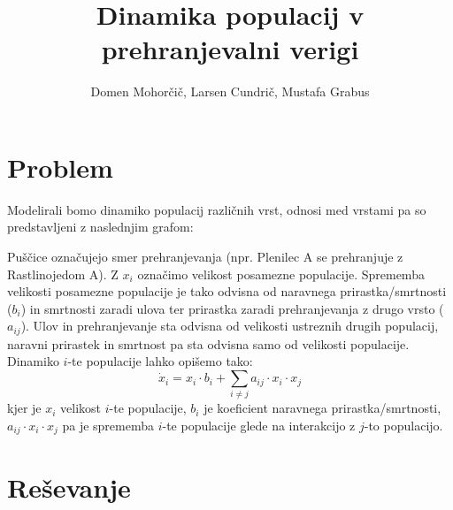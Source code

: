 \documentclass[a4paper, 12pt]{article}
\begin{document}
\title{Dinamika populacij v prehranjevalni verigi}
\author{Domen Mohorčič, Larsen Cundrič, Mustafa Grabus}
\maketitle

\section{Problem} \label{problem}
Modelirali bomo dinamiko populacij različnih vrst, odnosi med vrstami pa so predstavljeni
z naslednjim grafom: \\
\begin{center}
\end{center}
Puščice označujejo smer prehranjevanja (npr. Plenilec A se prehranjuje z Rastlinojedom A).
Z $ x_{i} $ označimo velikost posamezne populacije. Sprememba velikosti posamezne populacije
je tako odvisna od naravnega prirastka/smrtnosti ($ b_{i} $) in smrtnosti zaradi ulova ter prirastka zaradi
prehranjevanja z drugo vrsto ($ a_{ij} $). Ulov in prehranjevanje sta odvisna od velikosti ustreznih drugih populacij,
naravni prirastek in smrtnost pa sta odvisna samo od velikosti populacije. Dinamiko $ i $-te
populacije lahko opišemo tako:
\begin{equation}
	\dot x_{i} = x_{i}\cdot b_{i} + \sum_{i \not = j} a_{ij}\cdot x_{i}\cdot x_{j}
\end{equation}
kjer je $ x_{i} $ velikost $ i $-te populacije, $ b_{i} $ je koeficient naravnega prirastka/smrtnosti,
$ a_{ij}\cdot x_{i}\cdot x_{j} $ pa je sprememba $ i $-te populacije glede na interakcijo z $ j $-to populacijo.

\section{Reševanje}
\end{document}
